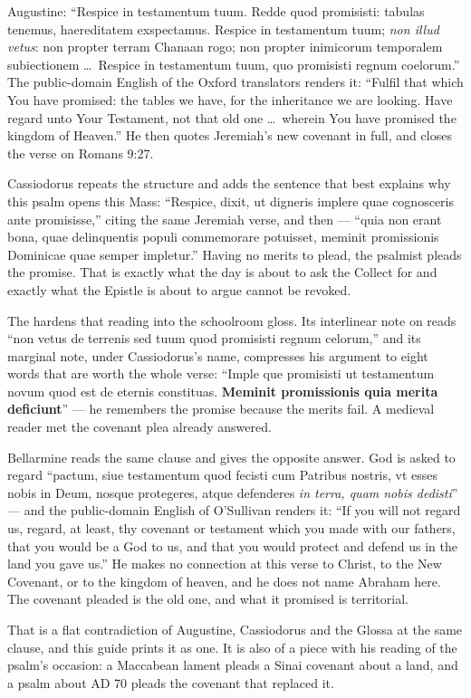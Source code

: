 \begin{witnessnote}
Augustine: ``Respice in testamentum tuum. Redde quod promisisti: tabulas
tenemus, haereditatem exspectamus. Respice in testamentum tuum; \textit{non
illud vetus}: non propter terram Chanaan rogo; non propter inimicorum
temporalem subiectionem \dots\ Respice in testamentum tuum, quo promisisti
regnum coelorum.'' The public-domain English of the Oxford translators renders
it: ``Fulfil that which You have promised: the tables we have, for the
inheritance we are looking. Have regard unto Your Testament, not that old one
\dots\ wherein You have promised the kingdom of Heaven.'' He then quotes
Jeremiah's new covenant in full, and closes the verse on Romans 9:27.

Cassiodorus repeats the structure and adds the sentence that best explains why
this psalm opens this Mass: ``Respice, dixit, ut digneris implere quae
cognosceris ante promisisse,'' citing the same Jeremiah verse, and then ---
``quia non erant bona, quae delinquentis populi commemorare potuisset, meminit
promissionis Dominicae quae semper impletur.'' Having no merits to plead, the
psalmist pleads the promise. That is exactly what the day is about to ask the
Collect for and exactly what the Epistle is about to argue cannot be revoked.
\end{witnessnote}

The  hardens that reading into the schoolroom gloss. Its
interlinear note on  reads ``non vetus de
terrenis sed tuum quod promisisti regnum celorum,'' and its marginal note,
under Cassiodorus's name, compresses his argument to eight words that are worth
the whole verse: ``Imple que promisisti ut testamentum novum quod est de
eternis constituas. \textbf{Meminit promissionis quia merita deficiunt}'' ---
he remembers the promise because the merits fail. A medieval reader met the
covenant plea already answered.

\begin{witnessnote}
Bellarmine reads the same clause and gives the opposite answer. God is asked to
regard ``pactum, siue testamentum quod fecisti cum Patribus nostris, vt esses
nobis in Deum, nosque protegeres, atque defenderes \emph{in terra, quam nobis
dedisti}'' --- and the public-domain English of O'Sullivan renders it: ``If you
will not regard us, regard, at least, thy covenant or testament which you made
with our fathers, that you would be a God to us, and that you would protect and
defend us in the land you gave us.'' He makes no connection at this verse to
Christ, to the New Covenant, or to the kingdom of heaven, and he does not name
Abraham here. The covenant pleaded is the old one, and what it promised is
territorial.

That is a flat contradiction of Augustine, Cassiodorus and the Glossa at the
same clause, and this guide prints it as one. It is also of a piece with his
reading of the psalm's occasion: a Maccabean lament pleads a Sinai covenant
about a land, and a psalm about AD 70 pleads the covenant that replaced it.
\end{witnessnote}

